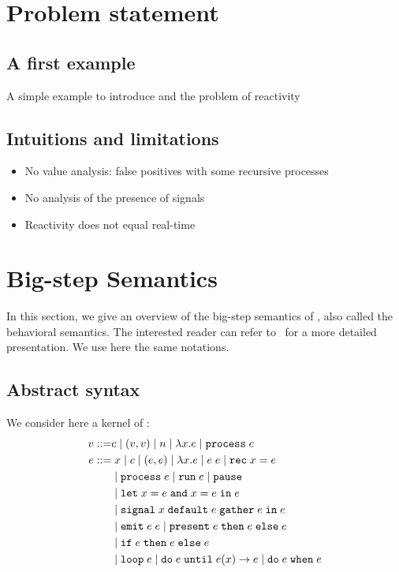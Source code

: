 \documentclass[9pt,preprint]{sigplanconf}
\newcommand{\sdeq}{::=}
\begin{document}
\section{Problem statement}

\subsection{A first example}

A simple example to introduce \rml{} and the problem of reactivity

\subsection{Intuitions and limitations}

\begin{itemize}
\item No value analysis: false positives with some recursive processes
\item No analysis of the presence of signals
\item Reactivity does not equal real-time
\end{itemize}

\section{Big-step Semantics}

In this section, we give an overview of the big-step semantics of \rml{}, also called the behavioral semantics. The interested reader can refer to~\cite{Mandel:2005} for a more detailed presentation. We use here the same notations.

\subsection{Abstract syntax}

We consider here a kernel of \rml{}:
%
\begin{align*}
v \sdeq & c \mid (v, v) \mid n \mid \elam{x}{e} \mid \eproc{e} \\
e \sdeq &\phantom{\mid}  x \mid c \mid (e, e) \mid \elam{x}{e} 
  \mid \eapp{e}{e} \mid \erec{x}{e} \\
  & \mid \eproc{e} \mid \erun{e} \mid \epause{}  \\
& \mid \eletpar{x}{e}{x}{e}{e} \\
 &\mid \esig{x}{e}{e}{e} \\
 & \mid \eemit{e}{e} \mid \epres{e}{e}{e} \\
 & \mid \eite{e}{e}{e} \\
 &  \mid \eloop{e} \mid \euntil{e}{e}{x}{e} 
   \mid \ewhen{e}{e} 
\end{align*}
\end{document}
